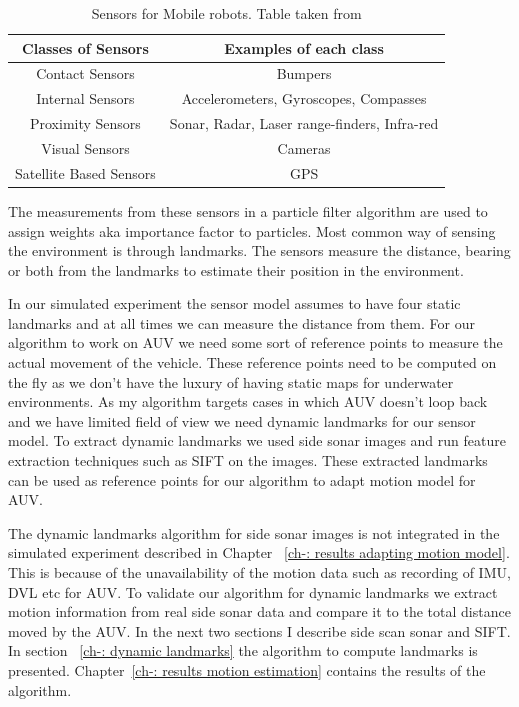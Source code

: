 \documentclass[12pt]{dalcsthesis}
\begin{document}
\begin {table}[tbh]
\centering
\begin{tabular}{|c|c|}
\hline 
\textbf{Classes of Sensors} & \textbf{ Examples of each class} \\ 
\hline 
Contact Sensors & Bumpers \\ 
\hline 
Internal Sensors & Accelerometers, Gyroscopes, Compasses \\ 
\hline 
Proximity Sensors & Sonar, Radar, Laser range-finders, Infra-red \\ 
\hline 
Visual Sensors  & Cameras \\ 
\hline 
Satellite Based Sensors & GPS \\ 
\hline 
\end{tabular}
\caption{\label{tab-: classes of sensors} Sensors for Mobile robots. Table taken from \cite{thrun2005probabilistic}}
\end{table}
The measurements from these sensors in a particle filter algorithm are used to assign weights aka importance factor to particles. Most common way of sensing the environment is through landmarks. The sensors measure the distance,	 bearing or both from the landmarks to estimate their position in the environment. 

In our simulated experiment the sensor model assumes to have four static landmarks and at all times we can measure the distance from them. For our algorithm to work on AUV we need some sort of reference points to measure the actual movement of the vehicle. These reference points need to be computed on the fly as we don't have the luxury of having static maps for underwater environments. As my algorithm targets cases in which AUV doesn't loop back and we have limited field of view we need dynamic landmarks for our sensor model. To extract dynamic landmarks we used side sonar images and run feature extraction techniques such as SIFT on the images. These extracted landmarks can be used as reference points for our algorithm to adapt motion model for AUV.

The dynamic landmarks algorithm for side sonar images is not integrated in the simulated experiment described in Chapter ~\ref{ch-: results adapting motion model}. This is because of the unavailability of the motion data such as recording of IMU, DVL etc for AUV. To validate our algorithm for dynamic landmarks we extract motion information from real side sonar data and compare it to the total distance moved by the AUV. In the next two sections I describe side scan sonar and SIFT. In section ~\ref{ch-: dynamic landmarks} the algorithm to compute landmarks is presented. Chapter~\ref{ch-: results motion estimation} contains the results of the algorithm.  
\end{document}
